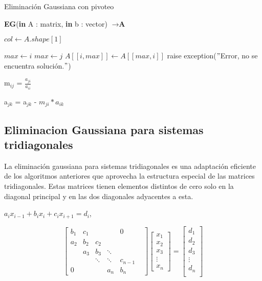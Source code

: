 \begin{algorithm}
\caption{Eliminación Gaussiana con pivoteo}
\begin{algorithmic}
\State \textbf{EG}(\textbf{in} A : matrix, \textbf{in} b : vector) $\to \textbf{A}$
 
 \State $col \gets A.shape[1]$
 
        \State $max \gets i$
                \State $max \gets j$
            \EndIf
        \EndFor
        \State $A[[i,max]] \gets A[[max,i]]$
    \EndIf
        \State  raise exception($"$Error, no se encuentra solución.$"$) 
    \EndIf
\EndFor
{}

    \State m$_{ij}$ = $\frac{a_{ji}}{a_{ii}}$
    
        \State a$_{jk}$ = a$_{jk}$ - $m_{ji}*{a_{ik}}$
    \EndFor

\EndFor
\end{algorithmic}
\end{algorithm}

\subsection{Eliminacion Gaussiana para sistemas tridiagonales}
\label{tridiagonal}
La eliminación gaussiana para sistemas tridiagonales es una adaptación eficiente de los algoritmos anteriores que aprovecha la estructura especial de las matrices tridiagonales. Estas matrices tienen elementos distintos de cero solo en la diagonal principal y en las dos diagonales adyacentes a esta.
\begin{center}
    $a_{i}x_{i-1}+b_{i}x_{i}+c_{i}x_{i+1} = d_{i}$,
\end{center}
    
    \[ \begin{bmatrix}
b_1 & c_1 & & & 0\\
a_2 & b_2 & c_2 & & & \\
    & a_3 & b_3 & \ddots & \\
    &    & \ddots &  \ddots&c_{n-1}\\
0   &    &   & a_n & b_n
     \end{bmatrix}
  \begin{bmatrix}
        x_{1}\\
        x_{2} \\
        x_{3}\\ 
        \vdots\\ 
        x_{n}  
 \end{bmatrix}
 =
 \begin{bmatrix}
     d_{1} \\
     d_{2} \\
     d_{3} \\
     \vdots \\
     d_{n} \\
 \end{bmatrix}
 \] 

